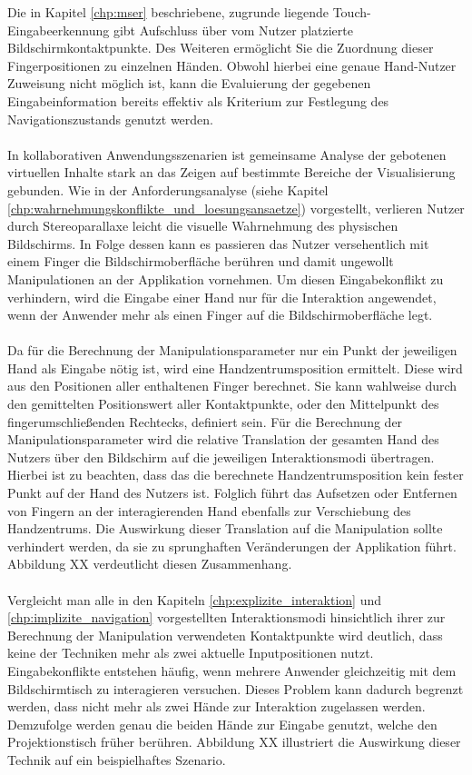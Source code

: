 Die in Kapitel \ref{chp:mser} beschriebene, zugrunde liegende Touch-Eingabeerkennung gibt Aufschluss über vom Nutzer platzierte Bildschirmkontaktpunkte. Des Weiteren ermöglicht Sie die Zuordnung dieser Fingerpositionen zu einzelnen Händen. Obwohl hierbei eine genaue Hand-Nutzer Zuweisung nicht möglich ist, kann die Evaluierung der gegebenen Eingabeinformation bereits effektiv als Kriterium zur Festlegung des Navigationszustands genutzt werden.
\\\\
In kollaborativen Anwendungsszenarien ist gemeinsame Analyse der gebotenen virtuellen Inhalte stark an das Zeigen auf bestimmte Bereiche der Visualisierung gebunden. Wie in der Anforderungsanalyse (siehe Kapitel \ref{chp:wahrnehmungskonflikte_und_loesungsansaetze}) vorgestellt, verlieren Nutzer durch Stereoparallaxe leicht die visuelle Wahrnehmung des physischen Bildschirms. In Folge dessen kann es passieren das Nutzer versehentlich mit einem Finger die Bildschirmoberfläche berühren und damit ungewollt Manipulationen an der Applikation vornehmen. Um diesen Eingabekonflikt zu verhindern, wird die Eingabe einer Hand nur für die Interaktion angewendet, wenn der Anwender mehr als einen Finger auf die Bildschirmoberfläche legt. 
\\\\
Da für die Berechnung der Manipulationsparameter nur ein Punkt der jeweiligen Hand als Eingabe nötig ist, wird eine Handzentrumsposition ermittelt. Diese wird aus den Positionen aller enthaltenen Finger berechnet. Sie kann wahlweise durch den gemittelten Positionswert aller Kontaktpunkte, oder den Mittelpunkt des fingerumschließenden Rechtecks, definiert sein. Für die Berechnung der Manipulationsparameter wird die relative Translation der gesamten Hand des Nutzers über den Bildschirm auf die jeweiligen Interaktionsmodi übertragen. Hierbei ist zu beachten, dass das die berechnete Handzentrumsposition kein fester Punkt auf der Hand des Nutzers ist. Folglich führt das Aufsetzen oder Entfernen von Fingern an der interagierenden Hand ebenfalls zur Verschiebung des Handzentrums. Die Auswirkung dieser Translation auf die Manipulation sollte verhindert werden, da sie zu sprunghaften Veränderungen der Applikation führt. Abbildung XX verdeutlicht diesen Zusammenhang.
\\\\
Vergleicht man alle in den Kapiteln \ref{chp:explizite_interaktion} und \ref{chp:implizite_navigation} vorgestellten Interaktionsmodi hinsichtlich ihrer zur Berechnung der Manipulation verwendeten Kontaktpunkte wird deutlich, dass keine der Techniken mehr als zwei aktuelle Inputpositionen nutzt. Eingabekonflikte entstehen häufig, wenn mehrere Anwender gleichzeitig mit dem Bildschirmtisch zu interagieren versuchen. Dieses Problem kann dadurch begrenzt werden, dass nicht mehr als zwei Hände zur Interaktion zugelassen werden. Demzufolge werden genau die beiden Hände zur Eingabe genutzt, welche den Projektionstisch früher berühren. Abbildung XX illustriert die Auswirkung dieser Technik auf ein beispielhaftes Szenario.
